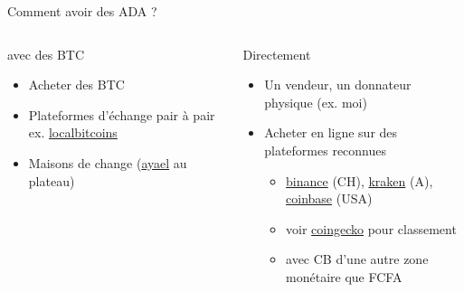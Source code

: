 \documentclass{beamer}
\begin{document}
\begin{frame}[label={sec:orgc72683b}]{Comment avoir des ADA ?}
  \begin{columns}
    \begin{column}{0.45\columnwidth}
      \begin{block}{avec des BTC}
        \begin{itemize}
        \item Acheter des BTC
        \item Plateformes d'échange pair à pair ex. \href{https://localbitcoins.com/fr/}{localbitcoins}
        \item Maisons de change (\href{https://ayael-entreprise.com/}{ayael} au plateau)
        \end{itemize}
      \end{block}
    \end{column}

    \begin{column}{0.55\columnwidth}
      \begin{block}{Directement}
        \begin{itemize}
        \item Un vendeur, un donnateur physique (ex. moi)
        \item Acheter en ligne sur des plateformes reconnues
          \begin{itemize}
          \item \href{https://www.binance.com/fr}{binance} (CH), \href{https://www.kraken.com/}{kraken} (A), \href{https://www.coinbase.com/fr/}{coinbase} (USA)
          \item voir \href{https://www.coingecko.com/fr}{coingecko} pour classement
          \item avec CB d'une autre zone monétaire que FCFA
          \end{itemize}
        \end{itemize}
      \end{block}
    \end{column}
  \end{columns}
\end{frame}
\end{document}
